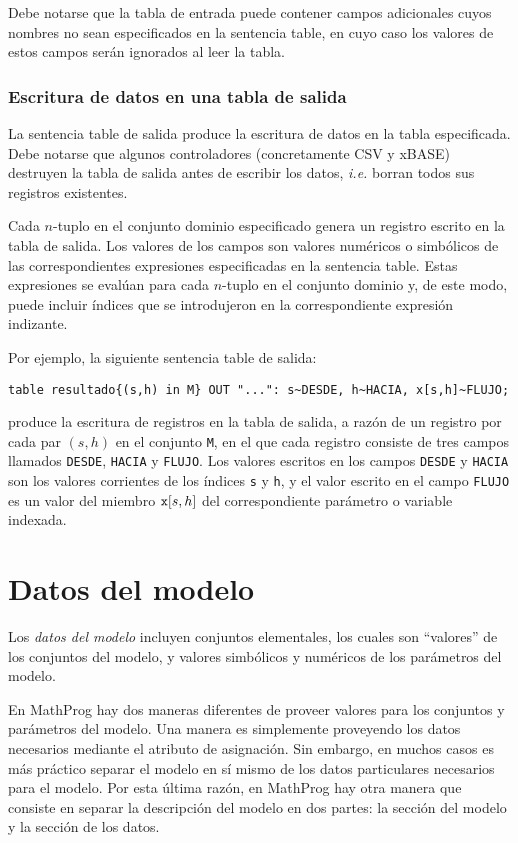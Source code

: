 \documentclass[11pt,spanish]{report}
\begin{document}
Debe notarse que la tabla de entrada puede contener campos adicionales cuyos nombres no sean especificados en la sentencia table, en cuyo caso los valores de estos campos serán ignorados al leer la tabla.

\subsection{Escritura de datos en una tabla de salida}

La sentencia table de salida produce la escritura de datos en la tabla especificada. Debe notarse que algunos controladores (concretamente CSV y xBASE) destruyen la tabla de salida antes de escribir los datos, {\it i.e.} borran todos sus registros existentes.

Cada $n$-tuplo en el conjunto dominio especificado genera un registro escrito en la tabla de salida. Los valores de los campos son valores numéricos o simbólicos de las correspondientes expresiones especificadas en la sentencia table. Estas expresiones se evalúan para cada $n$-tuplo en el conjunto dominio y, de este modo, puede incluir índices que se introdujeron en la correspondiente expresión indizante.

Por ejemplo, la siguiente sentencia table de salida:

\noindent\hfil
\verb|table resultado{(s,h) in M} OUT "...": s~DESDE, h~HACIA, x[s,h]~FLUJO;|

\noindent
produce la escritura de registros en la tabla de salida, a razón de un registro por cada par $(s,h)$ en el conjunto {\tt M}, en el que cada registro consiste de tres campos llamados {\tt DESDE}, {\tt HACIA} y {\tt FLUJO}. Los valores escritos en los campos {\tt DESDE} y {\tt HACIA} son los valores corrientes de los índices {\tt s} y {\tt h}, y el valor escrito en el campo {\tt FLUJO} es un valor del miembro ${\tt x}[s,h]$ del correspondiente parámetro o variable indexada.


\chapter{Datos del modelo}

Los {\it datos del modelo} incluyen conjuntos elementales, los cuales son ``valores'' de los conjuntos del modelo, y valores simbólicos y numéricos de los parámetros del modelo.

En MathProg hay dos maneras diferentes de proveer valores para los conjuntos y parámetros del modelo. Una manera es simplemente proveyendo los datos necesarios mediante el atributo de asignación. Sin embargo, en muchos casos es más práctico separar el modelo en sí mismo de los datos particulares necesarios para el modelo. Por esta última razón, en MathProg hay otra manera que consiste en separar la descripción del modelo en dos partes: la sección del modelo y la sección de los datos.
\end{document}
